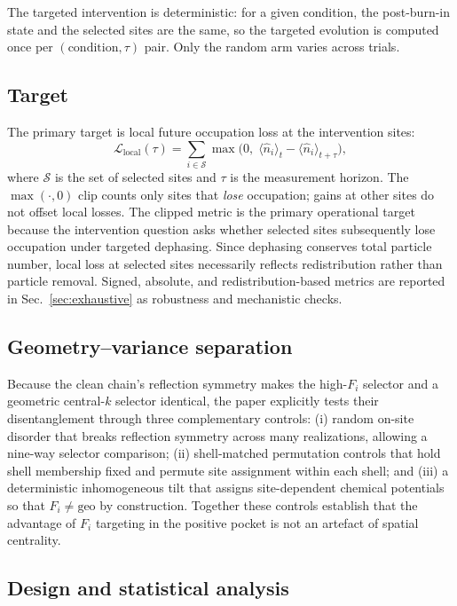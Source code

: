 \documentclass[aps,prresearch,reprint,amsmath,amssymb,longbibliography,floatfix]{revtex4-2}
\newcommand{\Fi}{F_i}
\newcommand{\nop}{\hat{n}}
\begin{document}
The targeted intervention is deterministic: for a given condition, the
post-burn-in state and the selected sites are the same, so the targeted
evolution is computed once per $(\text{condition},\tau)$ pair.
Only the random arm varies across trials.

\subsection{Target}

The primary target is local future occupation loss at the intervention
sites:
\begin{equation}
\label{eq:target}
\mathcal{L}_{\mathrm{local}}(\tau) =
  \sum_{i\in\mathcal{S}}
  \max\bigl(0,\;\langle\nop_i\rangle_t - \langle\nop_i\rangle_{t+\tau}\bigr),
\end{equation}
where $\mathcal{S}$ is the set of selected sites and $\tau$ is the
measurement horizon.
The $\max(\cdot,0)$ clip counts only sites that \emph{lose} occupation;
gains at other sites do not offset local losses.
The clipped metric is the primary operational target because the
intervention question asks whether selected sites subsequently lose
occupation under targeted dephasing.
Since dephasing conserves total particle number, local loss at selected
sites necessarily reflects redistribution rather than particle removal.
Signed, absolute, and redistribution-based metrics are reported in
Sec.~\ref{sec:exhaustive} as robustness and mechanistic checks.

\subsection{Geometry--variance separation}

Because the clean chain's reflection symmetry makes the high-$\Fi$ selector
and a geometric central-$k$ selector identical, the paper explicitly tests
their disentanglement through three complementary controls:
(i) random on-site disorder that breaks reflection symmetry across many
realizations, allowing a nine-way selector comparison;
(ii) shell-matched permutation controls that hold shell membership fixed and
permute site assignment within each shell; and
(iii) a deterministic inhomogeneous tilt that assigns site-dependent
chemical potentials so that $\Fi\neq\mathrm{geo}$ by construction.
Together these controls establish that the advantage of $\Fi$ targeting
in the positive pocket is not an artefact of spatial centrality.

\subsection{Design and statistical analysis}
\end{document}
